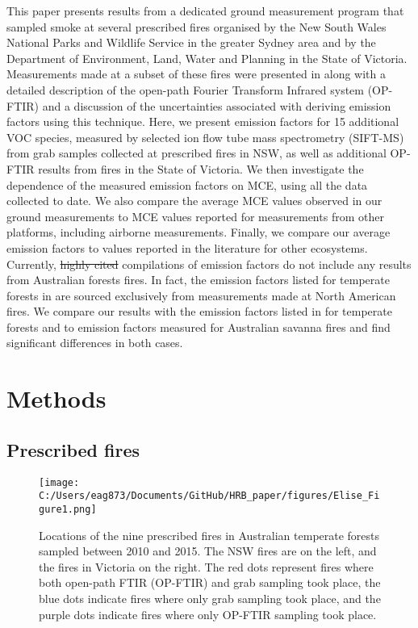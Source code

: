 \documentclass[acp, manuscript]{copernicus}
\providecommand{\DIFadd}[1]{{\protect\color{blue}\uwave{#1}}} %
\providecommand{\DIFdel}[1]{{\protect\color{red}\sout{#1}}}                      %
\providecommand{\DIFaddbegin}{} %
\providecommand{\DIFaddend}{} %
\providecommand{\DIFdelbegin}{} %
\providecommand{\DIFdelend}{} %
\begin{document}
This paper presents results from a dedicated ground measurement program that sampled smoke at several prescribed fires organised by the New South Wales National Parks and Wildlife Service in the greater Sydney area and by the Department of Environment, Land, Water and Planning %
in the State of Victoria. Measurements made at a subset of these fires were presented in \citet{Paton-Walsh2014} along with a detailed description of the open-path Fourier Transform Infrared system (OP-FTIR) and a discussion of the uncertainties associated with deriving emission factors using this technique.
Here, we present emission factors for 15 additional VOC species, measured by selected ion flow tube mass spectrometry (SIFT-MS) from grab samples collected at prescribed fires in NSW, as well as additional OP-FTIR results from fires in the State of Victoria.
We then investigate the dependence of the measured emission factors on MCE, using all the data collected to date. We also compare the average MCE values observed in our ground measurements to MCE values reported for measurements from other platforms, including airborne measurements. Finally, we compare our average emission factors to values reported in the literature for other ecosystems. Currently, \DIFdelbegin \DIFdel{highly cited }\DIFdelend \DIFaddbegin \DIFadd{widely used }\DIFaddend compilations of emission factors \citep[e.g.,][]{Akagi2011} do not include any results from Australian forests fires. In fact, the emission factors listed for temperate forests in \citet{Akagi2011} are sourced exclusively from measurements made at North American fires. We compare our results with the emission factors listed in \citet[Table S4, February 2015 update]{Akagi2011} for temperate forests and to emission factors measured for Australian savanna fires and find significant differences in both cases. %

\section{Methods}
\subsection{Prescribed fires}


\begin{figure}
  \texttt{[image: C:/Users/eag873/Documents/GitHub/HRB\_paper/figures/Elise\_Figure1.png]}
  \caption{Locations of the nine prescribed fires in Australian temperate forests sampled between 2010 and 2015. The NSW fires are on the left, and the fires in Victoria on the right. The red dots represent fires where both open-path FTIR (OP-FTIR) and grab sampling took place, the blue dots indicate fires where only grab sampling took place, and the purple dots indicate fires where only OP-FTIR sampling took place.}
  \label{fig:map}
\end{figure}
\end{document}
